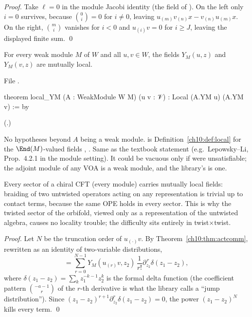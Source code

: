 \emph{Proof.}  Take $\ell=0$ in the module Jacobi identity (the  field of
).  On the left only $i=0$ survives, because $\binom0i=0$ for $i\ne0$, leaving
$u_{(m)}v_{(n)}x-v_{(n)}u_{(m)}x$.  On the right, $\binom mi$ vanishes for $i<0$ and
$u_{(i)}v=0$ for $i\ge J$, leaving the displayed finite sum. \qed

\begin{theorem}\label{ch10:thm:localYM}
For every weak module $M$ of $W$ and all $u,v\in W$, the fields $Y_M(u,z)$ and $Y_M(v,z)$ are
mutually local.
\end{theorem}
\noindent File .
\begin{leancode}
theorem local_YM (A : WeakModule W M) (u v : 𝒱) : Local (A.YM u) (A.YM v) := by
\end{leancode}
(.)
\begin{dictionary}
No hypotheses beyond $A$ being a weak module.   is Definition~\ref{ch10:def:local}
for the $\End(M)$-valued fields , .  Same as the textbook statement
(e.g.\ Lepowsky--Li, Prop.~4.2.1 in the module setting).  It could be vacuous only if
 were unsatisfiable; the adjoint module of any VOA is a weak module, and the
library's  is one.
\end{dictionary}

\begin{physics}
Every sector of a chiral CFT (every module) carries mutually local fields: braiding of two untwisted operators acting on any representation is trivial up to contact terms, because the same OPE holds in every sector. This is why the twisted sector of the orbifold, viewed only as a representation of the untwisted algebra, causes no locality trouble; the difficulty sits entirely in twist$\times$twist.
\end{physics}

\emph{Proof.}  Let $N$ be the truncation order of $u_{(\cdot)}v$.  By
Theorem~\ref{ch10:thm:actcomm}, rewritten as an identity of two-variable distributions,
\begin{equation*}
  [Y_M(u,z_1),Y_M(v,z_2)]=\sum_{r=0}^{N-1}Y_M(u_{(r)}v,z_2)\,
  \frac1{r!}\partial_{z_2}^{\,r}\delta(z_1-z_2),
\end{equation*}
where $\delta(z_1-z_2)=\sum_kz_1^{-k-1}z_2^k$ is the formal delta function (the coefficient
pattern $\binom{-a-1}{r}$ of the $r$-th derivative is what the library calls a ``jump
distribution'').  Since $(z_1-z_2)^{r+1}\partial^r_{z_2}\delta(z_1-z_2)=0$, the power $(z_1-z_2)^N$
kills every term.  \qed

